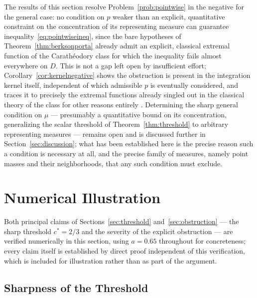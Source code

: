 \documentclass[pdflatex,sn-mathphys-num]{sn-jnl}%
\theoremstyle{thmstyleone}%
\theoremstyle{thmstyletwo}%
\theoremstyle{thmstylethree}%
\begin{document}
The results of this section resolve Problem~\ref{prob:pointwise} in the negative for the general case: no condition on $p$ weaker than an explicit, quantitative constraint on the concentration of its representing measure can guarantee inequality~\eqref{eq:pointwiseineq}, since the bare hypotheses of Theorem~\ref{thm:berksonporta} already admit an explicit, classical extremal function of the Carath\'eodory class for which the inequality fails almost everywhere on $D$. This is not a gap left open by insufficient effort; Corollary~\ref{cor:kernelnegative} shows the obstruction is present in the integration kernel itself, independent of which admissible $p$ is eventually considered, and traces it to precisely the extremal functions already singled out in the classical theory of the class for other reasons entirely \cite{ahlfors1979complex}. Determining the sharp general condition on $\mu$ --- presumably a quantitative bound on its concentration, generalizing the scalar threshold of Theorem~\ref{thm:threshold} to arbitrary representing measures --- remains open and is discussed further in Section~\ref{sec:discussion}; what has been established here is the precise reason such a condition is necessary at all, and the precise family of measures, namely point masses and their neighborhoods, that any such condition must exclude.

%
%
%

\section{Numerical Illustration}
\label{sec:numerics}

Both principal claims of Sections~\ref{sec:threshold} and~\ref{sec:obstruction} --- the sharp threshold $c^\ast=2/3$ and the severity of the explicit obstruction --- are verified numerically in this section, using $a=0.65$ throughout for concreteness; every claim itself is established by direct proof independent of this verification, which is included for illustration rather than as part of the argument.

\subsection{Sharpness of the Threshold}
\end{document}
